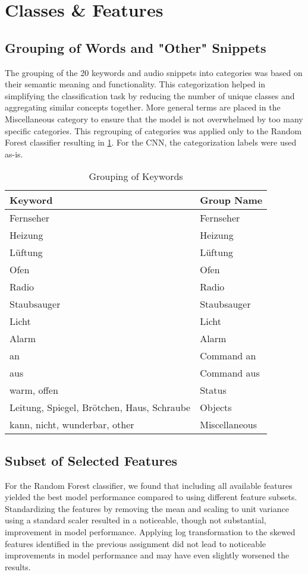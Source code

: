 \section{Classes \& Features}

\subsection{Grouping of Words and "Other" Snippets}
The grouping of the 20 keywords and audio snippets into categories was based on their semantic meaning and functionality. This categorization helped in simplifying the classification task by reducing the number of unique classes and aggregating similar concepts together. More general terms are placed in the Miscellaneous category to ensure that the model is not overwhelmed by too many specific categories. This regrouping of categories was applied only to the Random Forest classifier resulting in \ref{tab:keyword_grouping}. For the CNN, the categorization labels were used as-is.

\begin{table}
  \caption{Grouping of Keywords}
  \label{tab:keyword_grouping}
  \centering
  \begin{tabular}{ll}
    \toprule
    Keyword & Group Name \\
    \midrule
    Fernseher & Fernseher \\
    Heizung & Heizung \\
    Lüftung & Lüftung \\
    Ofen & Ofen \\
    Radio & Radio \\
    Staubsauger & Staubsauger \\
    Licht & Licht \\
    Alarm & Alarm \\
    an & Command an \\
    aus & Command aus \\
    warm, offen & Status \\
    Leitung, Spiegel, Brötchen, Haus, Schraube & Objects \\
    kann, nicht, wunderbar, other & Miscellaneous \\
    \bottomrule
  \end{tabular}
\end{table}

\subsection{Subset of Selected Features}
For the Random Forest classifier, we found that including all available features yielded the best model performance compared to using different feature subsets. Standardizing the features by removing the mean and scaling to unit variance using a standard scaler resulted in a noticeable, though not substantial, improvement in model performance. Applying log transformation to the skewed features identified in the previous assignment did not lead to noticeable improvements in model performance and may have even slightly worsened the results.

